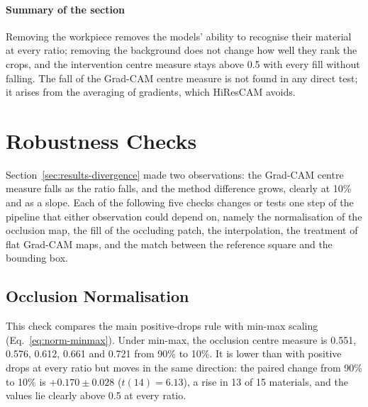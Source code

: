 \paragraph{Summary of the section}
Removing the workpiece removes the models' ability to recognise their material at every
ratio; removing the background does not change how well they rank the crops, and the
intervention centre measure stays above 0.5 with every fill without falling. The fall of
the Grad-CAM centre measure is not found in any direct test; it arises from the averaging
of gradients, which HiResCAM avoids.

\FloatBarrier

\section{Robustness Checks}
\label{sec:results-robustness}

Section~\ref{sec:results-divergence} made two observations: the Grad-CAM centre
measure falls as the ratio falls, and the method difference grows, clearly at 10\% and
as a slope. Each of the following five checks changes or tests one step of the pipeline
that either observation could depend on, namely the normalisation of the occlusion map, the fill of
the occluding patch, the interpolation, the treatment of flat Grad-CAM maps, and the
match between the reference square and the bounding box.

\subsection{Occlusion Normalisation}
\label{sec:results-normalisation}

This check compares the main positive-drops rule with min-max
scaling (Eq.~\eqref{eq:norm-minmax}). Under
min-max, the occlusion centre measure is 0.551, 0.576, 0.612, 0.661 and 0.721 from
90\% to 10\%. It is lower than with positive drops at every ratio but moves in the same
direction: the paired change from 90\% to 10\% is $+0.170 \pm 0.028$
($t(14) = 6.13$), a rise in 13 of 15 materials, and the values lie clearly above 0.5
at every ratio.

